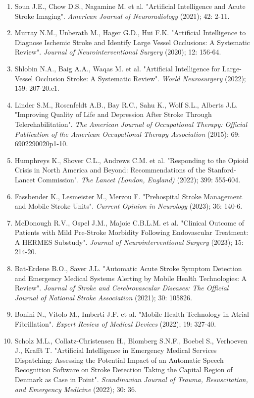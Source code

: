 {{\small
\begin{enumerate}
    \item Soun J.E., Chow D.S., Nagamine M. et al. "Artificial Intelligence and Acute Stroke Imaging". \textit{American Journal of Neuroradiology} (2021); 42: 2-11.
    \item Murray N.M., Unberath M., Hager G.D., Hui F.K. "Artificial Intelligence to Diagnose Ischemic Stroke and Identify Large Vessel Occlusions: A Systematic Review". \textit{Journal of Neurointerventional Surgery} (2020); 12: 156-64.
    \item Shlobin N.A., Baig A.A., Waqas M. et al. "Artificial Intelligence for Large-Vessel Occlusion Stroke: A Systematic Review". \textit{World Neurosurgery} (2022); 159: 207-20.e1.
    \item Linder S.M., Rosenfeldt A.B., Bay R.C., Sahu K., Wolf S.L., Alberts J.L. "Improving Quality of Life and Depression After Stroke Through Telerehabilitation". \textit{The American Journal of Occupational Therapy: Official Publication of the American Occupational Therapy Association} (2015); 69: 6902290020p1-10.
    \item Humphreys K., Shover C.L., Andrews C.M. et al. "Responding to the Opioid Crisis in North America and Beyond: Recommendations of the Stanford-Lancet Commission". \textit{The Lancet (London, England)} (2022); 399: 555-604.
    \item Fassbender K., Lesmeister M., Merzou F. "Prehospital Stroke Management and Mobile Stroke Units". \textit{Current Opinion in Neurology} (2023); 36: 140-6.
    \item McDonough R.V., Ospel J.M., Majoie C.B.L.M. et al. "Clinical Outcome of Patients with Mild Pre-Stroke Morbidity Following Endovascular Treatment: A HERMES Substudy". \textit{Journal of Neurointerventional Surgery} (2023); 15: 214-20.
    \item Bat-Erdene B.O., Saver J.L. "Automatic Acute Stroke Symptom Detection and Emergency Medical Systems Alerting by Mobile Health Technologies: A Review". \textit{Journal of Stroke and Cerebrovascular Diseases: The Official Journal of National Stroke Association} (2021); 30: 105826.
    \item Bonini N., Vitolo M., Imberti J.F. et al. "Mobile Health Technology in Atrial Fibrillation". \textit{Expert Review of Medical Devices} (2022); 19: 327-40.
    \item Scholz M.L., Collatz-Christensen H., Blomberg S.N.F., Boebel S., Verhoeven J., Krafft T. "Artificial Intelligence in Emergency Medical Services Dispatching: Assessing the Potential Impact of an Automatic Speech Recognition Software on Stroke Detection Taking the Capital Region of Denmark as Case in Point". \textit{Scandinavian Journal of Trauma, Resuscitation, and Emergency Medicine} (2022); 30: 36.

\end{enumerate}}}
